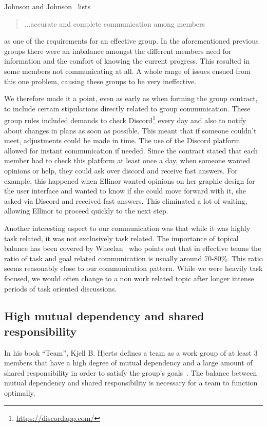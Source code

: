Johnson and Johnson~\cite[p. 44]{2013johnson} lists \begin{quote} ...accurate and complete communication among members \end{quote} as one of the requirements for an effective group. In the aforementioned previous groups there were an imbalance amongst the different members need for information and the comfort of knowing the current progress. This resulted in some members not communicating at all. A whole range of issues ensued from this one problem, causing these groups to be very ineffective.  

We therefore made it a point, even as early as when forming the group contract, to include certain stipulations directly related to group communication. These group rules included demands to check Discord\footnote{\url{https://discordapp.com/}} every day and also to notify about changes in plans as soon as possible. This meant that if someone couldn’t meet, adjustments could be made in time. The use of the Discord platform allowed for instant communication if needed. Since the contract stated that each member had to check this platform at least once a day, when someone wanted opinions or help, they could ask over discord and receive fast answers.
For example, this happened when Ellinor wanted opinions on her graphic design for the user interface and wanted to know if she could move forward with it, she asked via Discord and received fast answers. This eliminated a lot of waiting, allowing Ellinor to proceed quickly to the next step.

Another interesting aspect to our communication was that while it was highly task related, it was not exclusively task related. The importance of topical balance has been covered by Wheelan~\cite{wheelan} who points out that in effective teams the ratio of task and goal related communication is usually around 70-80\%. This ratio seems reasonably close to our communication pattern. While we were heavily task focused, we would often change to a non work related topic after longer intense periods of task oriented discussions.

\subsection{High mutual dependency and shared responsibility}
In his book “Team”, Kjell B. Hjertø defines a team as a work group of at least 3 members that have a high degree of mutual dependency and a large amount of shared responsibility in order to satisfy the group’s goals~\cite{team_book}. The balance between mutual dependency and shared responsibility is necessary for a team to function optimally.

